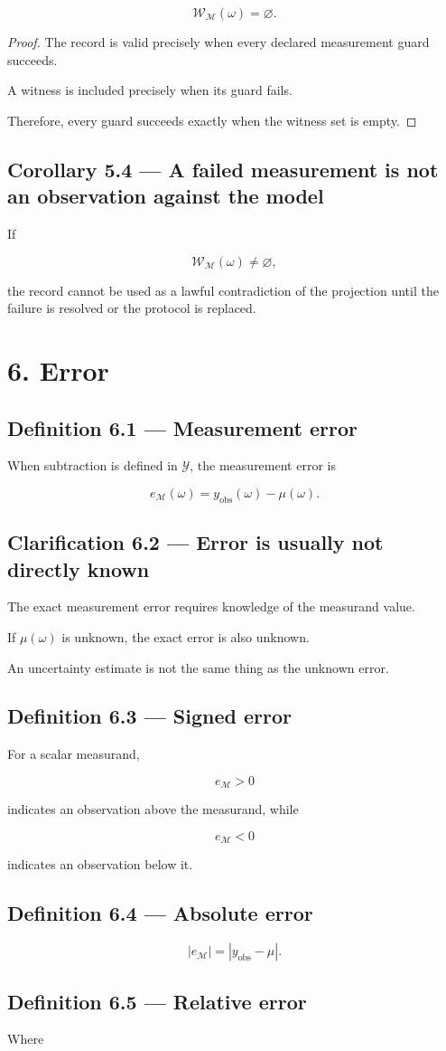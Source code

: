 \documentclass[11pt,oneside,openany]{book}
\newcommand{\PCsection}[1]{%
  \section*{#1}\addcontentsline{toc}{section}{#1}%
}
\newcommand{\PCsubsection}[1]{%
  \subsection*{#1}%
}
\begin{document}
\[
\boxed{ \mathcal W_{\mathcal M}(\omega)=\varnothing. }
\]

\begin{proof}
The record is valid precisely when every declared measurement guard succeeds.

A witness is included precisely when its guard fails.

Therefore, every guard succeeds exactly when the witness set is empty.

\end{proof}

\PCsubsection{Corollary 5.4 --- A failed measurement is not an observation against the model}

If

\[
\mathcal W_{\mathcal M}(\omega)\neq\varnothing,
\]

the record cannot be used as a lawful contradiction of the projection until the failure is resolved or the protocol is replaced.


\PCsection{6. Error}

\PCsubsection{Definition 6.1 --- Measurement error}

When subtraction is defined in \(\mathcal Y\), the measurement error is

\[
\boxed{ e_{\mathcal M}(\omega) = y_{\mathrm{obs}}(\omega)-\mu(\omega). }
\]

\PCsubsection{Clarification 6.2 --- Error is usually not directly known}

The exact measurement error requires knowledge of the measurand value.

If \(\mu(\omega)\) is unknown, the exact error is also unknown.

An uncertainty estimate is not the same thing as the unknown error.

\PCsubsection{Definition 6.3 --- Signed error}

For a scalar measurand,

\[
e_{\mathcal M}>0
\]

indicates an observation above the measurand, while

\[
e_{\mathcal M}<0
\]

indicates an observation below it.

\PCsubsection{Definition 6.4 --- Absolute error}

\[
\boxed{ |e_{\mathcal M}| = |y_{\mathrm{obs}}-\mu|. }
\]

\PCsubsection{Definition 6.5 --- Relative error}

Where
\end{document}
